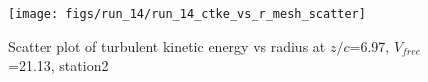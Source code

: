 \begin{figure}[H]
\centering
\texttt{[image: figs/run\_14/run\_14\_ctke\_vs\_r\_mesh\_scatter]}
\caption{Scatter plot of turbulent kinetic energy vs radius at $z/c$=6.97, $V_{free}$=21.13, station2}
\label{fig:run_14_ctke_vs_r_mesh_scatter}
\end{figure}


